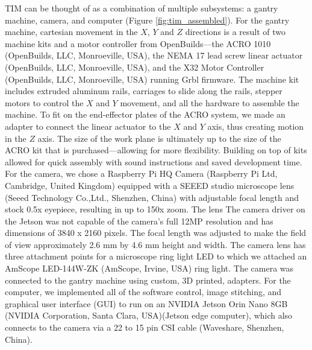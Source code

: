 \documentclass[a4paper,12pt]{article}
\newcommand{\R}[1]{\label{#1}\linelabel{#1}}
\begin{document}
TIM can be thought of as a combination of multiple subsystems: a gantry machine, camera, and computer (Figure \ref{fig:tim_assembled}). 
For the gantry machine, cartesian movement in the $X$, $Y$ and $Z$ directions is a result of two machine kits and a motor controller from OpenBuilds---the ACRO 1010 (OpenBuilds, LLC, Monroeville, USA), the NEMA 17 lead screw linear actuator (OpenBuilds, LLC, Monroeville, USA), and the X32 Motor Controller (OpenBuilds, LLC, Monroeville, USA) running Grbl firmware. %
The machine kit includes extruded aluminum rails, carriages to slide along the rails, stepper motors to control the $X$ and $Y$ movement, and all the hardware to assemble the machine. 
To fit on the end-effector plates of the ACRO system, we made an adapter to connect the linear actuator to the $X$ and $Y$ axis, thus creating motion in the $Z$ axis.
The size of the work plane is ultimately up to the size of the ACRO kit that is purchased---allowing for more flexibility.
Building on top of kits allowed for quick assembly with sound instructions and saved development time. 
For the camera, we chose a Raspberry Pi HQ Camera (Raspberry Pi Ltd, Cambridge, United Kingdom) equipped with a SEEED studio microscope lens (Seeed Technology Co.,Ltd., Shenzhen, China) with adjustable focal length and stock 0.5x eyepiece, resulting in up to 150x zoom. The lens \R{camera_driver}The camera driver on the Jetson was not capable of the camera's full 12MP resolution and has dimensions of 3840 x 2160 pixels. The focal length was adjusted to make the field of view approximately 2.6 mm by 4.6 mm height and width. \R{led_ring_light_1}The camera lens has three attachment points for a microscope ring light LED to which we attached an AmScope LED-144W-ZK (AmScope, Irvine, USA) ring light.\R{led_ring_light_2} The camera was connected to the gantry machine using custom, 3D printed, adapters.
For the computer, we implemented all of the software control, image stitching, and graphical user interface (GUI) to run on an NVIDIA Jetson Orin Nano 8GB (NVIDIA Corporation, Santa Clara, USA)(Jetson edge computer), which also connects to the camera via a 22 to 15 pin CSI cable (Waveshare, Shenzhen, China). %
\end{document}
